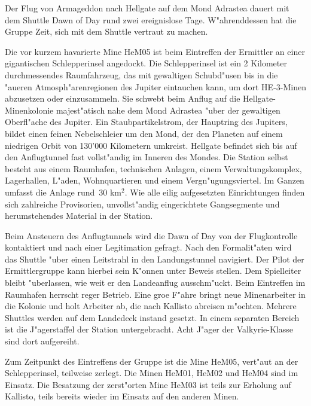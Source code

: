{}

Der Flug von Armageddon nach Hellgate auf dem Mond Adrastea dauert mit dem Shuttle Dawn of Day rund zwei ereignislose Tage. W"ahrenddessen hat die Gruppe Zeit, sich mit dem Shuttle vertraut zu machen.

Die vor kurzem havarierte Mine HeM05 ist beim Eintreffen der Ermittler an einer gigantischen Schlepperinsel angedockt. Die Schlepperinsel ist ein 2 Kilometer durchmessendes Raumfahrzeug, das mit gewaltigen Schubd"usen bis in die "au\3eren Atmosph"arenregionen des Jupiter eintauchen kann, um dort HE-3-Minen abzusetzen oder einzusammeln. Sie schwebt beim Anflug auf die Hellgate-Minenkolonie majest"atisch nahe dem Mond Adrastea "uber der gewaltigen Oberfl"ache des Jupiter. Ein Staubpartikelstrom, der Hauptring des Jupiters, bildet einen feinen Nebelschleier um den Mond, der den Planeten auf einem niedrigen Orbit von 130'000 Kilometern umkreist. Hellgate befindet sich bis auf den Anflugtunnel fast vollst"andig im Inneren des Mondes. Die Station selbst besteht aus einem Raumhafen, technischen Anlagen, einem Verwaltungskomplex, Lagerhallen, L"aden, Wohnquartieren und einem Vergn"ugungsviertel. Im Ganzen umfasst die Anlage rund~30 km$^{2}$. Wie alle eilig aufgesetzten Einrichtungen finden sich zahlreiche Provisorien, unvollst"andig eingerichtete Gangsegmente und herumstehendes Material in der Station.

Beim Ansteuern des Anflugtunnels wird die Dawn of Day von der Flugkontrolle kontaktiert und nach einer Legitimation gefragt. Nach den Formalit"aten wird das Shuttle "uber einen Leitstrahl in den Landungstunnel navigiert. Der Pilot der Ermittlergruppe kann hierbei sein K"onnen unter Beweis stellen. Dem Spielleiter bleibt "uberlassen, wie weit er den Landeanflug ausschm"uckt. Beim Eintreffen im Raumhafen herrscht reger Betrieb. Eine gro\3e F"ahre bringt neue Minenarbeiter in die Kolonie und holt Arbeiter ab, die nach Kallisto abreisen m"ochten. Mehrere Shuttles werden auf dem Landedeck instand gesetzt. In einem separaten Bereich ist die J"agerstaffel der Station untergebracht. Acht J"ager der Valkyrie-Klasse sind dort aufgereiht.

Zum Zeitpunkt des Eintreffens der Gruppe ist die Mine HeM05, vert"aut an der Schlepperinsel, teilweise zerlegt. Die Minen HeM01, HeM02 und HeM04 sind im Einsatz. Die Besatzung der zerst"orten Mine HeM03 ist teils zur Erholung auf Kallisto, teils bereits wieder im Einsatz auf den anderen Minen.

